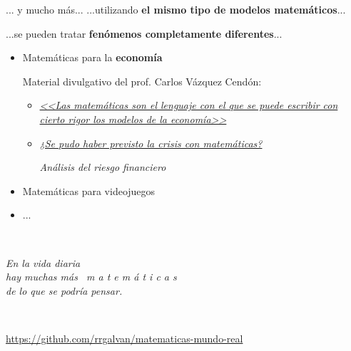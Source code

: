 \documentclass[
  unknownkeysallowed %
]{beamer}
\begin{document}
\begin{frame}{... y mucho más...}
  ...utilizando \textbf{el mismo tipo de modelos matemáticos}...
  \par\hfill ...se pueden tratar \alert{\bf fenómenos completamente diferentes}...
  \bigskip
  \begin{itemize}\itemsep1em
  \item Matemáticas para la \textbf{\alert{economía}}
    \par\bigskip
    Material divulgativo del prof. Carlos Vázquez Cendón:

    \begin{itemize}\itemsep0.5em
    \item
      \href{http://www.unir.net/empresa/revista/noticias/matematicas-para-la-economia/549201449354/}{\em
        <<Las matemáticas son el lenguaje con el que se puede escribir
        con cierto rigor los modelos de la economía>>}
    \item
      \href{http://www.rtve.es/alacarta/audios/eureka/eureka-se-pudo-haber-previsto-crisis-matematicas-31-05-13/1847482}{\em
        ¿Se pudo haber previsto la crisis con matemáticas?}
      \par\smallskip\hfill {\em Análisis del riesgo financiero}
    \end{itemize}
  \item Matemáticas para videojuegos
  \item ...
  \end{itemize}
\end{frame}

\begin{frame}{~}
  \begin{flushleft}\em
    En la vida diaria
    \\[1.2em]
    hay muchas más \ \alert{\large m a t e m á t i c a s}
    \\[1.2em]
    de lo que se podría pensar.
  \end{flushleft}
  \bigskip
  \begin{flushright}
    \Huge{}
  \end{flushright}
  \vfill
  \vfill
  ~
  \begin{flushright}
    \color{gray}\scriptsize\url{https://github.com/rrgalvan/matematicas-mundo-real}
  \end{flushright}
\end{frame}
\end{document}
